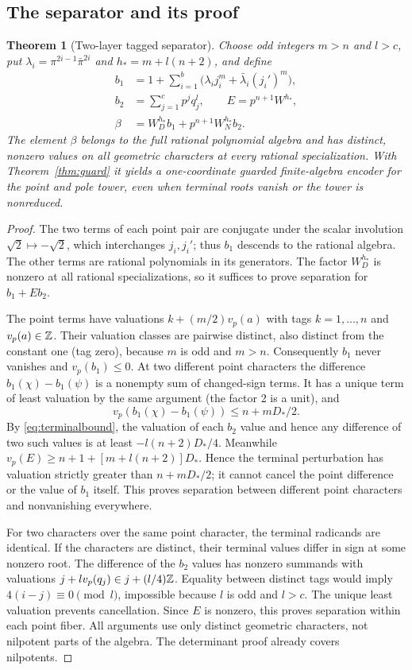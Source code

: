 \documentclass[11pt]{article}
\newtheorem{theorem}{Theorem}[section]
\begin{document}
\subsection{The separator and its proof}
\begin{theorem}[Two-layer tagged separator]\label{thm:two}
Choose odd integers $m>n$ and $l>c$, put
$\lambda_i=\pi^{2i-1}\bar\pi^{2i}$ and $h_*=m+l(n+2)$, and define
\begin{align*}
 b_1&=1+\sum_{i=1}^b\bigl(\lambda_i j_i^m+\bar\lambda_i(j_i')^m\bigr),\\
 b_2&=\sum_{j=1}^c p^j q_j^l,\qquad E=p^{n+1}W^{h_*},\\
 \beta&=W_D^{h_*} b_1+p^{n+1}W_N^{h_*} b_2.
\end{align*}
The element $\beta$ belongs to the full rational polynomial algebra
and has distinct, nonzero values on all geometric characters at every
rational specialization. With Theorem~\ref{thm:guard} it yields a
one-coordinate guarded finite-algebra encoder for the point and pole
tower, even when terminal roots vanish or the tower is nonreduced.
\end{theorem}
\begin{proof}
The two terms of each point pair are conjugate under the scalar
involution $\sqrt2\mapsto-\sqrt2$, which interchanges $j_i,j_i'$;
thus $b_1$ descends to the rational algebra. The other terms are
rational polynomials in its generators. The factor $W_D^{h_*}$ is
nonzero at all rational specializations, so it suffices to prove
separation for $b_1+Eb_2$.

The point terms have valuations $k+(m/2)v_p(a)$ with tags
$k=1,\ldots,n$ and $v_p(a)\in\mathbb Z$. Their valuation classes are
pairwise distinct, also distinct from the constant one (tag zero),
because $m$ is odd and $m>n$. Consequently $b_1$ never vanishes and
$v_p(b_1)\le0$. At two different point characters the difference
$b_1(\chi)-b_1(\psi)$ is a nonempty sum of changed-sign terms.
It has a unique term of least valuation by the same argument (the
factor 2 is a unit), and
\[
 v_p(b_1(\chi)-b_1(\psi))\le n+mD_*/2.
\]
By \eqref{eq:terminalbound}, the valuation of each $b_2$ value and
hence any difference of two such values is at least
$-l(n+2)D_*/4$. Meanwhile
$v_p(E)\ge n+1+[m+l(n+2)]D_*$. Hence the terminal perturbation has
valuation strictly greater than $n+mD_*/2$; it cannot cancel the
point difference or the value of $b_1$ itself. This proves separation
between different point characters and nonvanishing everywhere.

For two characters over the same point character, the terminal
radicands are identical. If the characters are distinct, their
terminal values differ in sign at some nonzero root. The difference
of the $b_2$ values has nonzero summands with valuations
$j+l v_p(q_j)\in j+(l/4)\mathbb Z$. Equality between distinct tags would
imply $4(i-j)\equiv0\pmod l$, impossible because $l$ is odd and
$l>c$. The unique least valuation prevents cancellation. Since $E$
is nonzero, this proves separation within each point fiber. All
arguments use only distinct geometric characters, not nilpotent
parts of the algebra. The determinant proof already covers nilpotents.
\end{proof}
\end{document}
